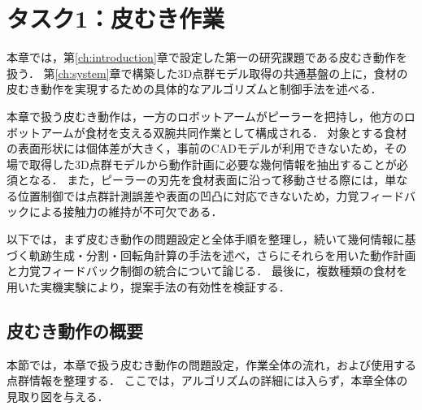 \chapter{タスク1：皮むき作業}
\label{ch:peeling}

本章では，第\ref{ch:introduction}章で設定した第一の研究課題である皮むき動作を扱う．
第\ref{ch:system}章で構築した3D点群モデル取得の共通基盤の上に，食材の皮むき動作を実現するための具体的なアルゴリズムと制御手法を述べる．

本章で扱う皮むき動作は，一方のロボットアームがピーラーを把持し，他方のロボットアームが食材を支える双腕共同作業として構成される．
対象とする食材の表面形状には個体差が大きく，事前のCADモデルが利用できないため，その場で取得した3D点群モデルから動作計画に必要な幾何情報を抽出することが必須となる．
また，ピーラーの刃先を食材表面に沿って移動させる際には，単なる位置制御では点群計測誤差や表面の凹凸に対応できないため，力覚フィードバックによる接触力の維持が不可欠である．

以下では，まず皮むき動作の問題設定と全体手順を整理し，続いて幾何情報に基づく軌跡生成・分割・回転角計算の手法を述べ，さらにそれらを用いた動作計画と力覚フィードバック制御の統合について論じる．
最後に，複数種類の食材を用いた実機実験により，提案手法の有効性を検証する．


\section{皮むき動作の概要}  %
\label{sec:peeling_phase_overview}

本節では，本章で扱う皮むき動作の問題設定，作業全体の流れ，および使用する点群情報を整理する．
ここでは，アルゴリズムの詳細には入らず，本章全体の見取り図を与える．

